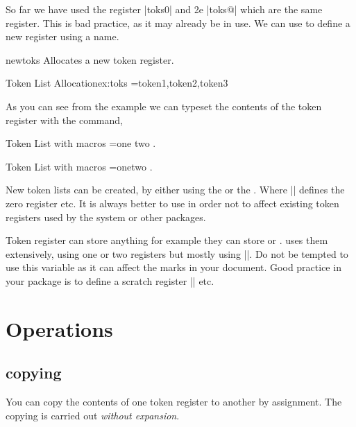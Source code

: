 So far we have used the register |toks0| and \latex2e |toks@| which are the same register. This is bad practice, as it may already be in use. We can use  to define a new register using a name.

\begin{docCommand}{newtoks}{}
Allocates a new token register.
\end{docCommand}


\begin{texexample}{Token List Allocation}{ex:toks}
\newtoks\alist 
\alist={token1,token2,token3}
\meaning\alist
\end{texexample}

As you can see from the example we can typeset the contents of the token register with the  command,

\begin{texexample}{Token List with macros}{}
\begingroup
\def\c{one}
\def\d{two}
\newtoks\blist 
\blist={{\c} {\d}}
\the\blist. 
\endgroup
\end{texexample}


\begin{texexample}{Token List with macros}{}
\begingroup
\def\c{one}
\def\d{two}
\newtoks\blist 
\blist={\c \d}
\the\blist. 
\endgroup
\end{texexample}

New token lists can be created, by either using the \cmd{\newtoks} or the \cmd{\toks}. Where || defines the zero register etc. It is always better to use \cmd{\newtoks} in order not to affect existing token registers used by the system or other packages.

Token register can store anything for example they can store \cmd{\vfil} or \cmd{\hfill}. \latexe uses them extensively, using one or two registers but mostly using |\@temptoken|. Do not be tempted to use this variable as it can affect the marks in your document. Good practice in your package is to define a scratch register |\mypackagetemptokena| etc.

\section{Operations}

\subsection{copying}

You can copy the contents of one token register to another by assignment. The copying is carried out \emph{without expansion}.

